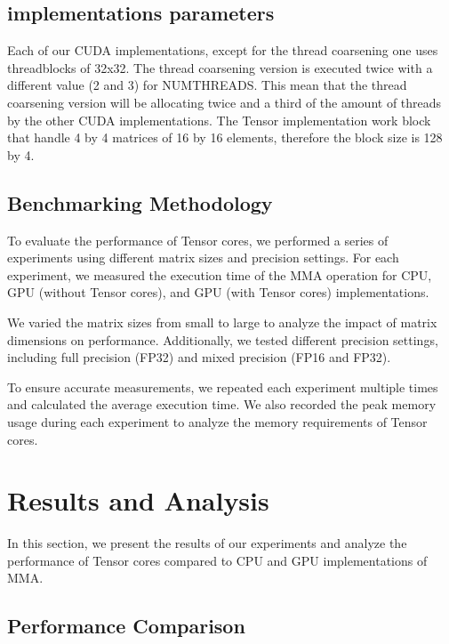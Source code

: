 \documentclass[conference]{IEEEtran}
\begin{document}
  \subsection{implementations parameters}
  Each of our CUDA implementations, except for the thread coarsening one uses threadblocks of 32x32.
  The thread coarsening version is executed twice with a different value (2 and 3) for NUMTHREADS. This
  mean that the thread coarsening version will be allocating twice and a third of the amount of threads
  by the other CUDA implementations. The Tensor implementation work block that handle 4 by 4 matrices of
  16 by 16 elements, therefore the block size is 128 by 4.

  \subsection{Benchmarking Methodology}\label{sec:benchmarking-methodology}
  
  To evaluate the performance of Tensor cores, we performed a series of experiments using different 
  matrix sizes and precision settings. For each experiment, we measured the execution time of the 
  MMA operation for CPU, GPU (without Tensor cores), and GPU (with Tensor cores) implementations.
  
  We varied the matrix sizes from small to large to analyze the impact of matrix dimensions on 
  performance. Additionally, we tested different precision settings, including full precision (FP32)
  and mixed precision (FP16 and FP32).
  
  To ensure accurate measurements, we repeated each experiment multiple times and calculated 
  the average execution time. We also recorded the peak memory usage during each experiment to 
  analyze the memory requirements of Tensor cores.
  
  \section{Results and Analysis}\label{sec:results-analysis}
  
  In this section, we present the results of our experiments and analyze the performance of 
  Tensor cores compared to CPU and GPU implementations of MMA.

  
  \subsection{Performance Comparison}\label{sec:performance-comparison}
\end{document}
